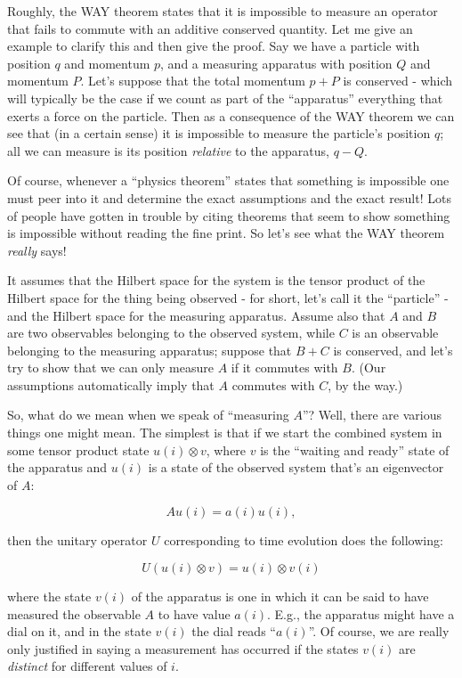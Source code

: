 \documentclass{article}
\begin{document}
Roughly, the WAY theorem states that it is impossible to measure an
operator that fails to commute with an additive conserved quantity. Let
me give an example to clarify this and then give the proof. Say we have
a particle with position \(q\) and momentum \(p\), and a measuring
apparatus with position \(Q\) and momentum \(P\). Let's suppose that the
total momentum \(p + P\) is conserved - which will typically be the case
if we count as part of the ``apparatus'' everything that exerts a force
on the particle. Then as a consequence of the WAY theorem we can see
that (in a certain sense) it is impossible to measure the particle's
position \(q\); all we can measure is its position \emph{relative} to
the apparatus, \(q - Q\).

Of course, whenever a ``physics theorem'' states that something is
impossible one must peer into it and determine the exact assumptions and
the exact result! Lots of people have gotten in trouble by citing
theorems that seem to show something is impossible without reading the
fine print. So let's see what the WAY theorem \emph{really} says!

It assumes that the Hilbert space for the system is the tensor product
of the Hilbert space for the thing being observed - for short, let's
call it the ``particle'' - and the Hilbert space for the measuring
apparatus. Assume also that \(A\) and \(B\) are two observables
belonging to the observed system, while \(C\) is an observable belonging
to the measuring apparatus; suppose that \(B + C\) is conserved, and
let's try to show that we can only measure \(A\) if it commutes with
\(B\). (Our assumptions automatically imply that \(A\) commutes with
\(C\), by the way.)

So, what do we mean when we speak of ``measuring \(A\)''? Well, there
are various things one might mean. The simplest is that if we start the
combined system in some tensor product state \(u(i) \otimes v\), where
\(v\) is the ``waiting and ready'' state of the apparatus and \(u(i)\)
is a state of the observed system that's an eigenvector of \(A\):

\[Au(i) = a(i)u(i),\]

then the unitary operator \(U\) corresponding to time evolution does the
following:

\[U(u(i) \otimes v) = u(i) \otimes v(i)\]

where the state \(v(i)\) of the apparatus is one in which it can be said
to have measured the observable \(A\) to have value \(a(i)\). E.g., the
apparatus might have a dial on it, and in the state \(v(i)\) the dial
reads ``\(a(i)\)''. Of course, we are really only justified in saying a
measurement has occurred if the states \(v(i)\) are \emph{distinct} for
different values of \(i\).
\end{document}
